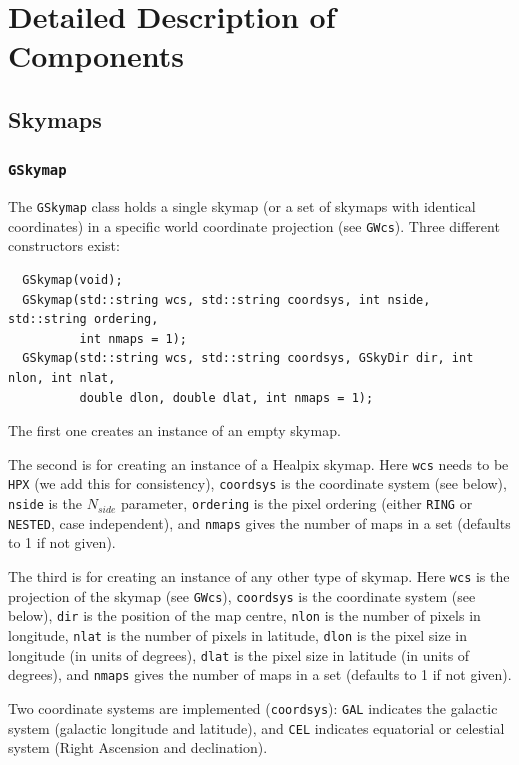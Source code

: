 \documentclass{article}[12pt,a4]
\begin{document}
\section{Detailed Description of Components}

\subsection{Skymaps}

\subsubsection{{\tt GSkymap}}

The {\tt GSkymap} class holds a single skymap (or a set of skymaps with identical coordinates)
in a specific world coordinate projection (see {\tt GWcs}).
Three different constructors exist:
\begin{verbatim}
  GSkymap(void);
  GSkymap(std::string wcs, std::string coordsys, int nside, std::string ordering,
          int nmaps = 1);
  GSkymap(std::string wcs, std::string coordsys, GSkyDir dir, int nlon, int nlat, 
          double dlon, double dlat, int nmaps = 1);
\end{verbatim}
The first one creates an instance of an empty skymap.

The second is for creating an instance of a Healpix skymap.
Here
{\tt wcs} needs to be {\tt HPX} (we add this for consistency),
{\tt coordsys} is the coordinate system (see below),
{\tt nside} is the $N_{side}$ parameter,
{\tt ordering} is the pixel ordering (either {\tt RING} or {\tt NESTED}, case independent),
and
{\tt nmaps} gives the number of maps in a set (defaults to 1 if not given).

The third is for creating an instance of any other type of skymap.
Here
{\tt wcs} is the projection of the skymap (see {\tt GWcs}),
{\tt coordsys} is the coordinate system (see below),
{\tt dir} is the position of the map centre,
{\tt nlon} is the number of pixels in longitude,
{\tt nlat} is the number of pixels in latitude,
{\tt dlon} is the pixel size in longitude (in units of degrees),
{\tt dlat} is the pixel size in latitude (in units of degrees),
and
{\tt nmaps} gives the number of maps in a set (defaults to 1 if not given).

Two coordinate systems are implemented ({\tt coordsys}):
{\tt GAL} indicates the galactic system (galactic longitude and latitude), and
{\tt CEL} indicates equatorial or celestial system (Right Ascension and declination).
\end{document}
